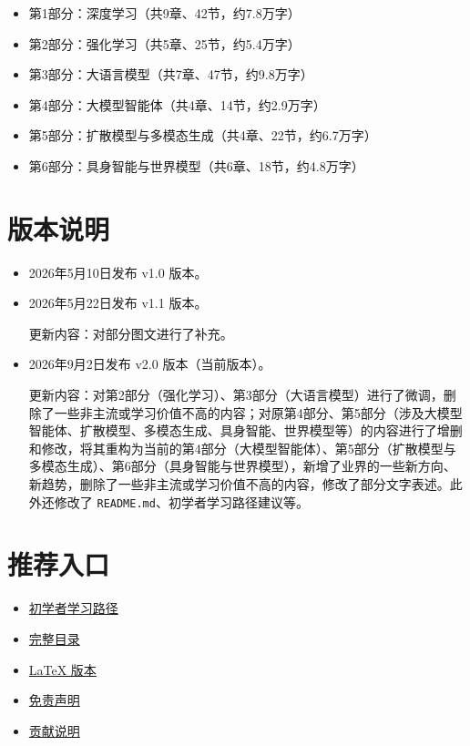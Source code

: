 \begin{itemize}
\tightlist
\item
  第1部分：深度学习（共9章、42节，约7.8万字）
\item
  第2部分：强化学习（共5章、25节，约5.4万字）
\item
  第3部分：大语言模型（共7章、47节，约9.8万字）
\item
  第4部分：大模型智能体（共4章、14节，约2.9万字）
\item
  第5部分：扩散模型与多模态生成（共4章、22节，约6.7万字）
\item
  第6部分：具身智能与世界模型（共6章、18节，约4.8万字）
\end{itemize}

\hypertarget{ux7248ux672cux8bf4ux660e}{%
\section{版本说明}\label{ux7248ux672cux8bf4ux660e}}

\begin{itemize}
\item
  2026年5月10日发布 v1.0 版本。
\item
  2026年5月22日发布 v1.1 版本。

  更新内容：对部分图文进行了补充。
\item
  2026年9月2日发布 v2.0 版本（当前版本）。

  更新内容：对第2部分（强化学习）、第3部分（大语言模型）进行了微调，删除了一些非主流或学习价值不高的内容；对原第4部分、第5部分（涉及大模型智能体、扩散模型、多模态生成、具身智能、世界模型等）的内容进行了增删和修改，将其重构为当前的第4部分（大模型智能体）、第5部分（扩散模型与多模态生成）、第6部分（具身智能与世界模型），新增了业界的一些新方向、新趋势，删除了一些非主流或学习价值不高的内容，修改了部分文字表述。此外还修改了 \texttt{README.md}、初学者学习路径建议等。
\end{itemize}

\hypertarget{ux63a8ux8350ux5165ux53e3}{%
\section{推荐入口}\label{ux63a8ux8350ux5165ux53e3}}

\begin{itemize}
\tightlist
\item
  \href{初学者学习路径.md}{初学者学习路径}
\item
  \href{目录.md}{完整目录}
\item
  \href{latex-project/README.md}{LaTeX 版本}
\item
  \href{DISCLAIMER.md}{免责声明}
\item
  \href{CONTRIBUTING.md}{贡献说明}
\end{itemize}

